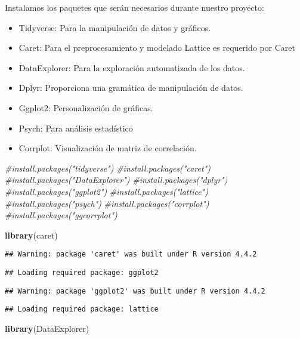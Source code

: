 \documentclass[
]{article}
\newenvironment{Shaded}{\begin{snugshade}}{\end{snugshade}}
\newcommand{\CommentTok}[1]{\textcolor[rgb]{0.56,0.35,0.01}{\textit{#1}}}
\newcommand{\FunctionTok}[1]{\textcolor[rgb]{0.13,0.29,0.53}{\textbf{#1}}}
\newcommand{\NormalTok}[1]{#1}
\providecommand{\tightlist}{%
  \setlength{\itemsep}{0pt}\setlength{\parskip}{0pt}}
\begin{document}
Instalamos los paquetes que serán necesarios durante nuestro proyecto:

\begin{itemize}
\tightlist
\item
  Tidyverse: Para la manipulación de datos y gráficos.
\item
  Caret: Para el preprocesamiento y modelado Lattice es requerido por
  Caret
\item
  DataExplorer: Para la exploración automatizada de los datos.
\item
  Dplyr: Proporciona una gramática de manipulación de datos.
\item
  Ggplot2: Personalización de gráficas.
\item
  Psych: Para análisis estadístico
\item
  Corrplot: Visualización de matriz de correlación.
\end{itemize}

\begin{Shaded}
\begin{Highlighting}[]
\CommentTok{\#install.packages("tidyverse")}
\CommentTok{\#install.packages("caret")}
\CommentTok{\#install.packages("DataExplorer")}
\CommentTok{\#install.packages("dplyr")}
\CommentTok{\#install.packages("ggplot2")}
\CommentTok{\#install.packages("lattice")}
\CommentTok{\#install.packages("psych")}
\CommentTok{\#install.packages("corrplot")}
\CommentTok{\#install.packages("ggcorrplot")}

\FunctionTok{library}\NormalTok{(caret)}
\end{Highlighting}
\end{Shaded}

\begin{verbatim}
## Warning: package 'caret' was built under R version 4.4.2
\end{verbatim}

\begin{verbatim}
## Loading required package: ggplot2
\end{verbatim}

\begin{verbatim}
## Warning: package 'ggplot2' was built under R version 4.4.2
\end{verbatim}

\begin{verbatim}
## Loading required package: lattice
\end{verbatim}

\begin{Shaded}
\begin{Highlighting}[]
\FunctionTok{library}\NormalTok{(DataExplorer)}
\end{Highlighting}
\end{Shaded}
\end{document}
